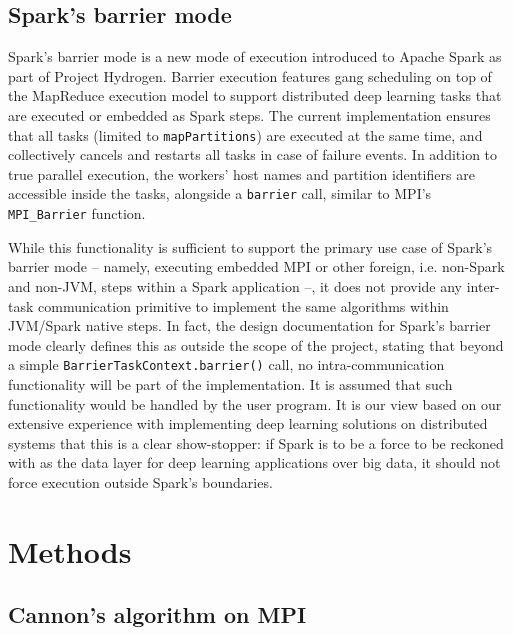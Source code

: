 \documentclass[fleqn,10pt]{SelfArx} %
\begin{document}
\subsection{Spark's barrier mode} %
\label{sub:spark_s_barrier_mode}

Spark's barrier mode is a new mode of execution introduced to Apache Spark as part of Project Hydrogen.\cite{projecthydrogensite} Barrier execution features gang scheduling on top of the MapReduce execution model to support distributed deep learning tasks that are executed or embedded as Spark steps. The current implementation ensures that all tasks (limited to \texttt{mapPartitions}) are executed at the same time, and collectively cancels and restarts all tasks in case of failure events. In addition to true parallel execution, the workers' host names and partition identifiers are accessible inside the tasks, alongside a \texttt{barrier} call, similar to MPI's \texttt{MPI\_Barrier} function.\cite{projecthydrogenpres}

While this functionality is sufficient to support the primary use case of Spark's barrier mode -- namely, executing embedded MPI or other foreign, i.e. non-Spark and non-JVM, steps within a Spark application --, it does not provide any inter-task communication primitive to implement the same algorithms within JVM/Spark native steps. In fact, the design documentation for Spark's barrier mode clearly defines this as outside the scope of the project, stating that beyond a simple \texttt{BarrierTaskContext.barrier()} call, no intra-communication functionality will be part of the implementation. It is assumed that such functionality would be handled by the user program. It is our view based on our extensive experience with implementing deep learning solutions on distributed systems that this is a clear show-stopper: if Spark is to be a force to be reckoned with as the data layer for deep learning applications over big data, it should not force execution outside Spark's boundaries.



\section{Methods} %
\label{sec:methods}

\subsection{Cannon's algorithm on MPI} %
\label{sub:cannon_s_algorithm_on_mpi}
\end{document}
